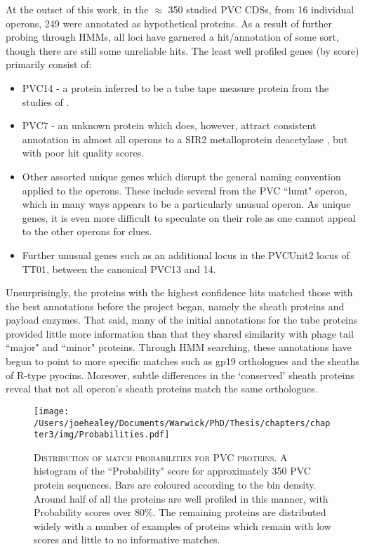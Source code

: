 At the outset of this work, in the $\approx$ 350 studied PVC CDSs, from 16 individual operons, 249 were annotated as hypothetical proteins. As a result of further probing through HMMs, all loci have garnered a hit/annotation of some sort, though there are still some unreliable hits. The least well profiled genes (by score) primarily consist of:
\begin{itemize}
 \item PVC14 - a protein inferred to be a tube tape measure protein from the studies of \cite{Rybakova2013}.
 \item PVC7 - an unknown protein which does, however, attract consistent annotation in almost all operons to a SIR2 metalloprotein deacetylase \citep{Shore2000}, but with poor hit quality scores.
 \item Other assorted unique genes which disrupt the general naming convention applied to the operons. These include several from the PVC ``lumt" operon, which in many ways appears to be a particularly unusual operon. As unique genes, it is even more difficult to speculate on their role as one cannot appeal to the other operons for clues.
 \item Further unusual genes such as an additional locus in the PVCUnit2 locus of \Plum{} TT01, between the canonical PVC13 and 14. 
\end{itemize}

Unsurprisingly, the proteins with the highest confidence hits matched those with the best annotations before the project began, namely the sheath proteins and payload enzymes. That said, many of the initial annotations for the tube proteins provided little more information than that they shared similarity with phage tail ``major" and ``minor" proteins. Through HMM searching, these annotations have begun to point to more specific matches such as gp19 orthologues and the sheaths of R-type pyocins. Moreover, subtle differences in the `conserved' sheath proteins reveal that not all operon's sheath proteins match the same orthologues.


\begin{figure}[h]
\centering
\texttt{[image: /Users/joehealey/Documents/Warwick/PhD/Thesis/chapters/chapter3/img/Probabilities.pdf]}
	\captionsetup{singlelinecheck=off, justification=justified, font=footnotesize, aboveskip=10pt}
	\caption[HHPred orthologue match scores]{\textsc{\normalsize Distribution of match probabilities for PVC proteins.}\vspace{0.1cm} \newline A histogram of the ``Probability" score for approximately 350 PVC protein sequences. Bars are coloured according to the bin density. Around half of all the proteins are well profiled in this manner, with Probability scores over 80\%. The remaining proteins are distributed widely with a number of examples of proteins which remain with low scores and little to no informative matches.}
	\label{probhist}
\end{figure}


